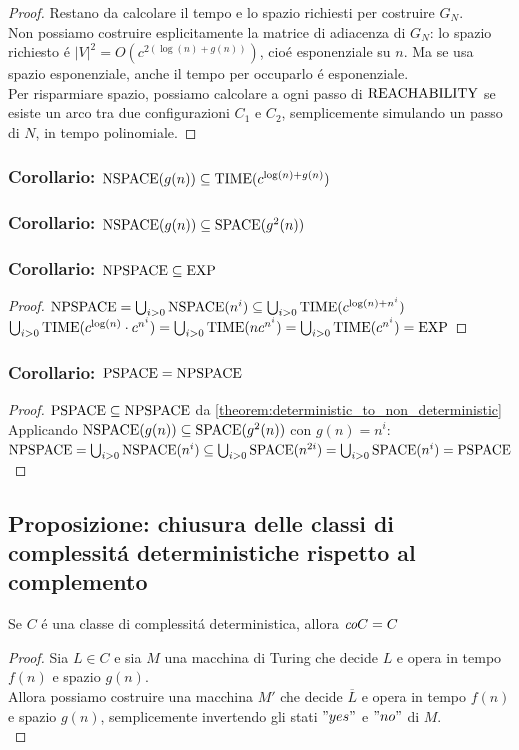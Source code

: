 \begin{proof}
Restano da calcolare il tempo e lo spazio richiesti per costruire $G_N$. \\

Non possiamo costruire esplicitamente la matrice di adiacenza di $G_N$:
lo spazio richiesto é $|V|^2 = O(c^{2(\log(n) + g(n))})$, cioé esponenziale su $n$.
Ma se usa spazio esponenziale, anche il tempo per occuparlo é esponenziale. \\

Per risparmiare spazio, possiamo calcolare a ogni passo di $\text{REACHABILITY}$ 
se esiste un arco tra due configurazioni $C_1$ e $C_2$,
semplicemente simulando un passo di $N$, in tempo polinomiale.
\end{proof}
\subsubsection{Corollario: $\text{NSPACE}(g(n)) \subseteq \text{TIME}(c^{\log(n) + g(n)})$}
\subsubsection{Corollario: $\text{NSPACE}(g(n)) \subseteq \text{SPACE}(g^2(n))$}
\subsubsection{Corollario: $\text{NPSPACE} \subseteq \text{EXP}$}
\begin{proof}
$
\text{NPSPACE} = \bigcup_{i>0} \text{NSPACE}(n^i) \subseteq \bigcup_{i>0} \text{TIME}(c^{\log(n) + n^i})$ \\
$\bigcup_{i>0} \text{TIME}(c^{\log(n)} \cdot c^{n^i}) = \bigcup_{i>0} \text{TIME}(n c^{n^i}) = \bigcup_{i>0} \text{TIME}(c^{n^i}) = \text{EXP}
$
\end{proof}
\subsubsection{Corollario: $\text{PSPACE} = \text{NPSPACE}$}
\begin{proof}
$\text{PSPACE} \subseteq \text{NPSPACE}$ da \ref{theorem:deterministic_to_non_deterministic} \\
Applicando $\text{NSPACE}(g(n)) \subseteq \text{SPACE}(g^2(n))$ con $g(n) = n^i$: \\
$\text{NPSPACE} = \bigcup_{i>0} \text{NSPACE}(n^i) \subseteq \bigcup_{i>0} \text{SPACE}(n^{2i}) = \bigcup_{i>0} \text{SPACE}(n^i) = \text{PSPACE}$
\end{proof}

\subsection{Proposizione: chiusura delle classi di complessitá deterministiche rispetto al complemento}
\label{proposizione:chiusura_classi_deterministiche_complemento}
Se $C$ é una classe di complessitá deterministica, allora $\textit{co} C = C$
\begin{proof}
Sia $L \in C$ e sia $M$ una macchina di Turing che decide $L$ e opera in tempo $f(n)$ e spazio $g(n)$. \\
Allora possiamo costruire una macchina $M'$ che decide $\overline{L}$ e opera in tempo $f(n)$ e spazio $g(n)$, semplicemente invertendo gli stati $"yes"$ e $"no"$  di $M$. \\
\end{proof}
